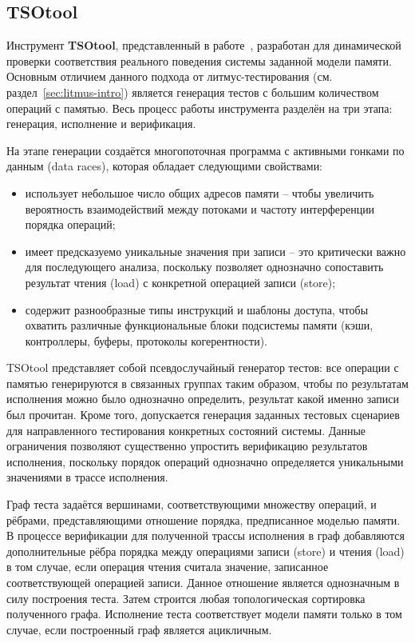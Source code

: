 \subsection{TSOtool}
\label{sec:manovit}

Инструмент \textbf{TSOtool}, представленный в работе~\cite{manovit},
разработан для динамической проверки соответствия реального поведения
системы заданной модели памяти. Основным отличием данного подхода от
литмус-тестирования (см. раздел~\ref{sec:litmus-intro}) является
генерация тестов с большим количеством операций с памятью. Весь
процесс работы инструмента разделён на три этапа: генерация,
исполнение и верификация.

На этапе генерации создаётся многопоточная программа с активными
гонками по данным (data races), которая обладает следующими свойствами:
\begin{itemize}
  \item использует небольшое число общих адресов памяти -- чтобы
    увеличить вероятность взаимодействий между потоками и частоту
    интерференции порядка операций;
  \item имеет предсказуемо уникальные значения при записи -- это
    критически важно для последующего анализа, поскольку позволяет
    однозначно сопоставить результат чтения (load) с конкретной
    операцией записи (store);
  \item содержит разнообразные типы инструкций и шаблоны доступа,
    чтобы охватить различные функциональные блоки подсистемы памяти
    (кэши, контроллеры, буферы, протоколы когерентности).
\end{itemize}

TSOtool представляет собой псевдослучайный генератор тестов: все
операции с памятью генерируются в связанных группах таким образом,
чтобы по результатам исполнения можно было однозначно определить,
результат какой именно записи был прочитан. Кроме того, допускается
генерация заданных тестовых сценариев для направленного тестирования
конкретных состояний системы. Данные ограничения позволяют
существенно упростить верификацию результатов исполнения, поскольку
порядок операций однозначно определяется уникальными значениями в
трассе исполнения.

Граф теста задаётся вершинами, соответствующими множеству операций, и
рёбрами, представляющими отношение порядка, предписанное моделью
памяти. В процессе верификации для полученной трассы исполнения в
граф добавляются дополнительные рёбра порядка между операциями записи
(store) и чтения (load) в том случае, если операция чтения считала
значение, записанное соответствующей операцией записи. Данное
отношение является однозначным в силу построения теста. Затем
строится любая топологическая сортировка полученного графа.
Исполнение теста соответствует модели памяти только в том случае,
если построенный граф является ацикличным.

